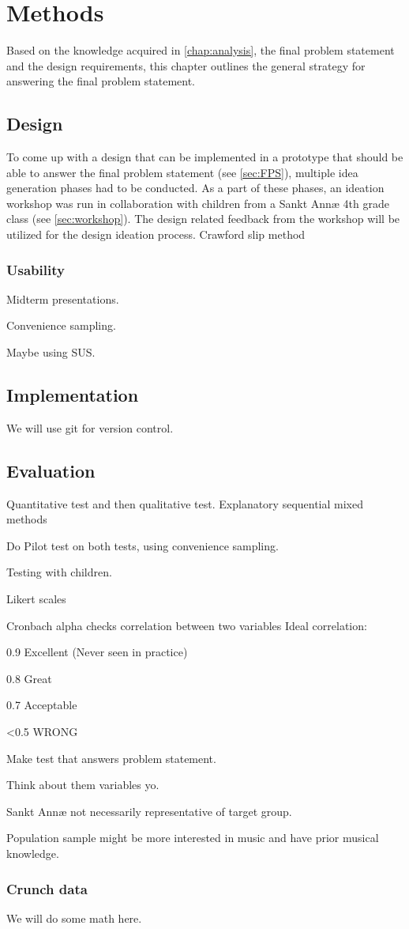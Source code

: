 \chapter{Methods}
Based on the knowledge acquired in \autoref{chap:analysis}, the final problem statement and the design requirements, this chapter outlines the general strategy for answering the final problem statement.
\section{Design}
To come up with a design that can be implemented in a prototype that should be able to answer the final problem statement (see \autoref{sec:FPS}), multiple idea generation phases had to be conducted. As a part of these phases, an ideation workshop was run in collaboration with children from a Sankt Annæ 4th grade class (see \autoref{sec:workshop}). The design related feedback from the workshop will be utilized for the design ideation process.
Crawford slip method
\subsection{Usability}
Midterm presentations.

Convenience sampling.

Maybe using SUS.
\section{Implementation}
We will use git for version control.
\section{Evaluation}
Quantitative test and then qualitative test.
Explanatory sequential mixed methods\cite[p.~21]{bjoernerBog}

Do Pilot test on both tests, using convenience sampling.

Testing with children\cite[p.~207]{bjoernerBog}.

Likert scales

Cronbach alpha checks correlation between two variables
Ideal correlation:

0.9 Excellent (Never seen in practice)

0.8 Great

0.7 Acceptable

<0.5 WRONG

Make test that answers problem statement.

Think about them variables yo.

Sankt Annæ not necessarily representative of target group.

Population sample might be more interested in music and have prior musical knowledge.

\subsection{Crunch data}
	We will do some math here.\cite{nyBog}